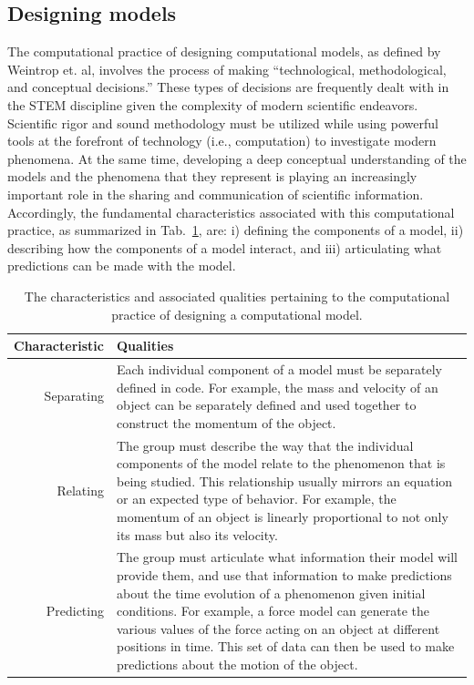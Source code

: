 \documentclass{msuphddissertation}
\begin{document}
\begin{doublespace}
%
%
%
%
%
%
%
%
%
%
%
%
%
%
%
%

\subsection{Designing models}

The computational practice of designing computational models, as defined by Weintrop et. al, involves the process of making ``technological, methodological, and conceptual decisions.''  These types of decisions are frequently dealt with in the STEM discipline given the complexity of modern scientific endeavors.  Scientific rigor and sound methodology must be utilized while using powerful tools at the forefront of technology (i.e., computation) to investigate modern phenomena.  At the same time, developing a deep conceptual understanding of the models and the phenomena that they represent is playing an increasingly important role in the sharing and communication of scientific information.  Accordingly, the fundamental characteristics associated with this computational practice, as summarized in Tab.~\ref{CH5:DesigningModels}, are: i) defining the components of a model, ii) describing how the components of a model interact, and iii) articulating what predictions can be made with the model.

\begin{table}
\begin{tabular}{r|p{}}
Characteristic & Qualities \\\hline\hline
Separating & Each individual component of a model must be separately defined in code.  For example, the mass and velocity of an object can be separately defined and used together to construct the momentum of the object.\\
Relating & The group must describe the way that the individual components of the model relate to the phenomenon that is being studied.  This relationship usually mirrors an equation or an expected type of behavior.  For example, the momentum of an object is linearly proportional to not only its mass but also its velocity.\\
Predicting & The group must articulate what information their model will provide them, and use that information to make predictions about the time evolution of a phenomenon given initial conditions.  For example, a force model can generate the various values of the force acting on an object at different positions in time.  This set of data can then be used to make predictions about the motion of the object.\\
\end{tabular}\caption{The characteristics and associated qualities pertaining to the computational practice of designing a computational model.}\label{CH5:DesigningModels}
\end{table}


\end{doublespace}
\end{document}
